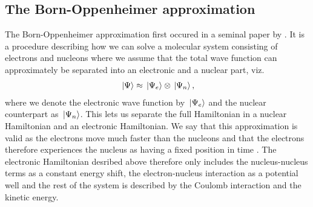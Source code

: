         \subsection{The Born-Oppenheimer approximation}
            The Born-Oppenheimer approximation first occured in a seminal paper
            by \citeauthor{born1927quantentheorie}
            \cite{born1927quantentheorie}.
            It is a procedure describing how we can solve a molecular system
            consisting of electrons and nucleons where we assume that the total
            wave function can approximately be separated into an electronic and
            a nuclear part, viz.
            \begin{align}
                \ket*{\Psi} \approx \ket*{\Psi_e}\otimes\ket*{\Psi_n},
            \end{align}
            where we denote the electronic wave function by $\ket*{\Psi_e}$ and
            the nuclear counterpart as $\ket*{\Psi_n}$.
            This lets us separate the full Hamiltonian in a nuclear Hamiltonian
            and an electronic Hamiltonian.
            We say that this approximation is valid as the electrons move much
            faster than the nucleons and that the electrons therefore
            experiences the nucleus as having a fixed position in time
            \cite{mayer2003simple}.
            The electronic Hamiltonian desribed above therefore only includes
            the nucleus-nucleus terms as a constant energy shift, the
            electron-nucleus interaction as a potential well and the rest of the
            system is described by the Coulomb interaction and the kinetic
            energy.



